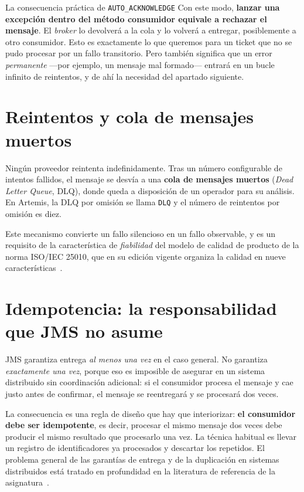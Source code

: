 \documentclass[11pt,a4paper]{book}
\begin{document}
\begin{cajaDef}{La consecuencia práctica de \texttt{AUTO\_ACKNOWLEDGE}}
	Con este modo, \textbf{lanzar una excepción dentro del método consumidor equivale a rechazar el mensaje}.
	El \emph{broker} lo devolverá a la cola y lo volverá a entregar, posiblemente a otro consumidor.
	Esto es exactamente lo que queremos para un ticket que no se pudo procesar por un fallo transitorio.
	Pero también significa que un error \emph{permanente} ---por ejemplo, un mensaje mal formado--- entrará en un bucle infinito de reintentos, y de ahí la necesidad del apartado siguiente.
\end{cajaDef}

\section{Reintentos y cola de mensajes muertos}

Ningún proveedor reintenta indefinidamente.
Tras un número configurable de intentos fallidos, el mensaje se desvía a una \textbf{cola de mensajes muertos} (\emph{Dead Letter Queue}, DLQ), donde queda a disposición de un operador para su análisis.
En Artemis, la DLQ por omisión se llama \texttt{DLQ} y el número de reintentos por omisión es diez.

Este mecanismo convierte un fallo silencioso en un fallo observable, y es un requisito de la característica de \emph{fiabilidad} del modelo de calidad de producto de la norma ISO/IEC 25010, que en su edición vigente organiza la calidad en nueve características~\cite{iso25010_2023}.

\section{Idempotencia: la responsabilidad que JMS no asume}

JMS garantiza entrega \emph{al menos una vez} en el caso general.
No garantiza \emph{exactamente una vez}, porque eso es imposible de asegurar en un sistema distribuido sin coordinación adicional: si el consumidor procesa el mensaje y cae justo antes de confirmar, el mensaje se reentregará y se procesará dos veces.

La consecuencia es una regla de diseño que hay que interiorizar: \textbf{el consumidor debe ser idempotente}, es decir, procesar el mismo mensaje dos veces debe producir el mismo resultado que procesarlo una vez.
La técnica habitual es llevar un registro de identificadores ya procesados y descartar los repetidos.
El problema general de las garantías de entrega y de la duplicación en sistemas distribuidos está tratado en profundidad en la literatura de referencia de la asignatura~\cite{kleppmann2017designing,vansteen2023distributed}.
\end{document}
